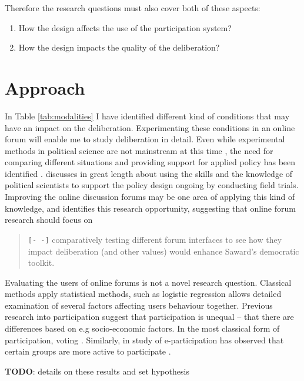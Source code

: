 \documentclass[journal,a4paper]{IEEEtran}
\begin{document}
Therefore the research questions must also cover both of these aspects:

\begin{enumerate}
\item How the design affects the use of the participation system?
\item How the design impacts the quality of the deliberation?
\end{enumerate}

\section{Approach}

In Table \ref{tab:modalities} I have identified different kind of conditions that may have an impact on the deliberation. Experimenting these conditions in an online forum will enable me to study deliberation in detail. Even while experimental methods in political science are not mainstream at this time \cite{green03,druckman06}, the need for comparing different situations and providing support for applied policy has been identified \cite{stoker10}.  discusses in great length about using the skills and the knowledge of political scientists to support the policy design ongoing by conducting field trials. Improving the online discussion forums may be one area of applying this kind of knowledge, and  identifies this research opportunity, suggesting that online forum research should focus on

\begin{quote}
\texttt{[- -]} comparatively testing different forum interfaces to see how they impact deliberation (and other values) would 
enhance Saward’s democratic toolkit.
\end{quote}

Evaluating the users of online forums is not a novel research question. Classical methods apply statistical methods, such as logistic regression allows detailed examination of several factors affecting users behaviour together. Previous research into participation suggest that participation is unequal -- that there are differences based on e.g socio-economic factors. In the most classical form of participation, voting . Similarly, in study of e-participation has observed that certain groups are more active to participate \cite{albrecht06,strandberg08}.

\textbf{TODO}: details on these results and set hypothesis
\end{document}
